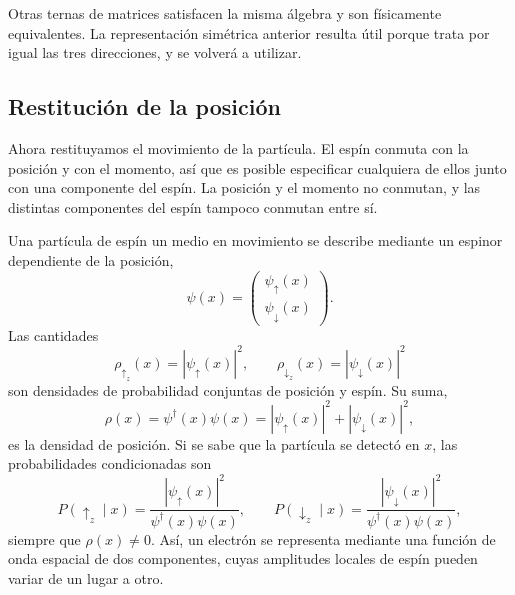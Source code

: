 \begin{classroomqa}
\end{classroomqa}

Otras ternas de matrices satisfacen la misma álgebra y son físicamente equivalentes. La representación simétrica anterior resulta útil porque trata por igual las tres direcciones, y se volverá a utilizar.

\subsection{Restitución de la posición}

Ahora restituyamos el movimiento de la partícula. El espín conmuta con la posición y con el momento, así que es posible especificar cualquiera de ellos junto con una componente del espín. La posición y el momento no conmutan, y las distintas componentes del espín tampoco conmutan entre sí.

Una partícula de espín un medio en movimiento se describe mediante un espinor dependiente de la posición,
\begin{equation}
\psi(x)=
\begin{pmatrix}
\psi_\uparrow(x)\\
\psi_\downarrow(x)
\end{pmatrix}.
\end{equation}
Las cantidades
\begin{equation}
\rho_{\uparrow_z}(x)=|\psi_\uparrow(x)|^2,
\qquad
\rho_{\downarrow_z}(x)=|\psi_\downarrow(x)|^2
\end{equation}
son densidades de probabilidad conjuntas de posición y espín. Su suma,
\begin{equation}
\rho(x)=\psi^\dagger(x)\psi(x)
=|\psi_\uparrow(x)|^2+|\psi_\downarrow(x)|^2,
\end{equation}
es la densidad de posición. Si se sabe que la partícula se detectó en \(x\), las probabilidades condicionadas son
\begin{equation}
P(\uparrow_z\mid x)
=
\frac{|\psi_\uparrow(x)|^2}{\psi^\dagger(x)\psi(x)},
\qquad
P(\downarrow_z\mid x)
=
\frac{|\psi_\downarrow(x)|^2}{\psi^\dagger(x)\psi(x)},
\end{equation}
siempre que \(\rho(x)\neq0\). Así, un electrón se representa mediante una función de onda espacial de dos componentes, cuyas amplitudes locales de espín pueden variar de un lugar a otro.

